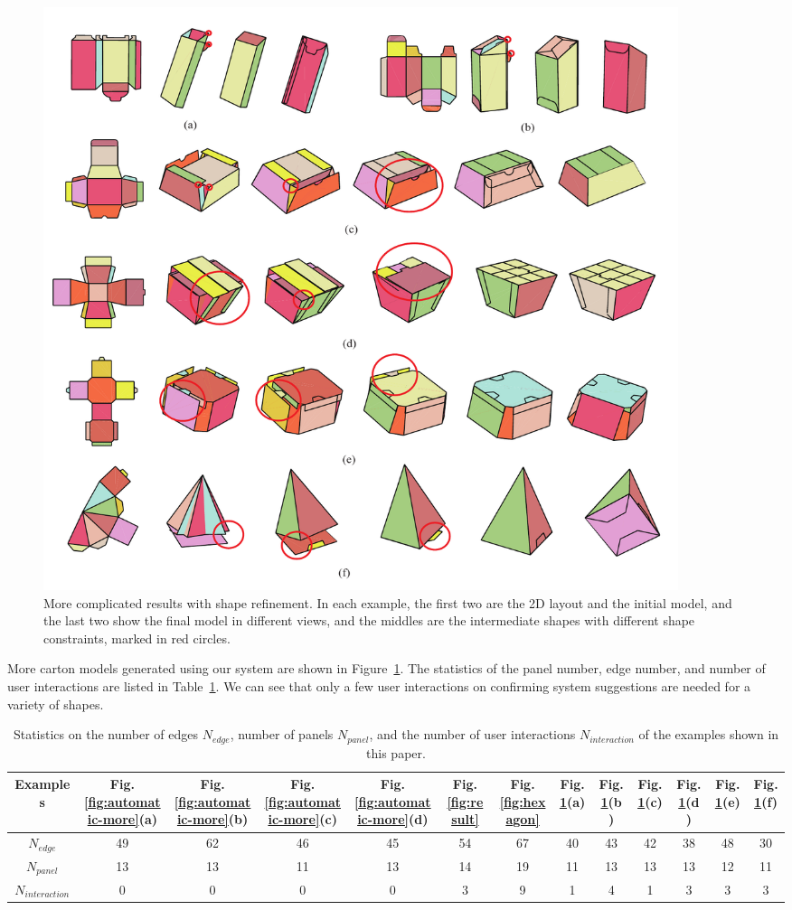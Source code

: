\begin{figure}
	\centering
	\includegraphics[width=0.9\textwidth]{images/newMore}
	\caption{More complicated results with shape refinement. In each example, the first two are the 2D layout and the initial model, and the last two show the final model in different views, and the middles are the intermediate shapes with different shape constraints, marked in red circles.}
	\label{fig:result-more}
\end{figure}



More carton models generated using our system  are shown in Figure~\ref{fig:result-more}.
The statistics of the panel number, edge number, and number of user interactions are listed in Table~\ref{table:statistics}. 
We can see that only a few user interactions on confirming system suggestions are needed for a variety of shapes.


\begin{table}
	\centering
	\caption{Statistics on the number of edges $N_{edge}$, number of panels $N_{panel}$, and the number of user interactions $N_{interaction}$ of the examples shown in this paper.}
	\setlength{\tabcolsep}{1pt}
	\begin{tabular}{c|c|c|c|c|c|c|c|c|c|c|c|c}
		\hline
		Examples & Fig.\ref{fig:automatic-more}(a) & Fig.\ref{fig:automatic-more}(b) &  Fig.\ref{fig:automatic-more}(c) & Fig.\ref{fig:automatic-more}(d) & Fig.\ref{fig:result} & Fig.\ref{fig:hexagon} & Fig.\ref{fig:result-more}(a) & Fig.\ref{fig:result-more}(b)& Fig.\ref{fig:result-more}(c) &  Fig.\ref{fig:result-more}(d) & Fig.\ref{fig:result-more}(e)& Fig.\ref{fig:result-more}(f)\\
		\hline
		$N_{edge}$ & 49 & 62 & 46 & 45 & 54 & 67 & 40 & 43 & 42 & 38 & 48 & 30\\
		$N_{panel}$  & 13 & 13 & 11 & 13 & 14 & 19 & 11 & 13 & 13 & 13 & 12 & 11\\
		$N_{interaction}$  & 0 & 0 & 0 & 0 & 3 & 9 & 1 & 4 & 1 & 3 & 3 & 3\\ 
		\hline
		\end{tabular}
		\label{table:statistics}
\end{table}


